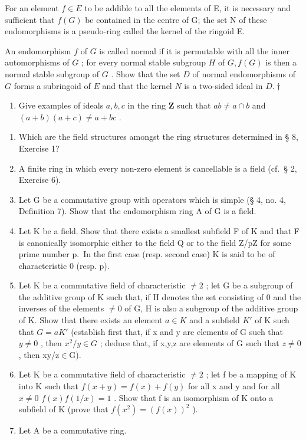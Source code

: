 For an element \(f \in E\) to be addible to all the elements of E, it is necessary and sufficient that \(f(G)\) be contained in the centre of G; the set N of these endomorphisms is a pseudo-ring called the kernel of the ringoid E.

An endomorphism \(f\) of \(G\) is called normal if it is permutable with all the inner automorphisms of \(G\) ; for every normal stable subgroup \(H\) of \(G, f(G)\) is then a normal stable subgroup of \(G\) . Show that the set \(D\) of normal endomorphisms of \(G\) forms a subringoid of \(E\) and that the kernel \(N\) is a two-sided ideal in \(D.†\)

\begin{enumerate}
\def\labelenumi{\arabic{enumi}.}
\setcounter{enumi}{15}
\tightlist
\item
  Give examples of ideals \(a, b, c\) in the ring \(\mathbf{Z}\) such that \(ab \neq a \cap b\) and \((a + b)(a + c) \neq a + bc\) .
\end{enumerate}

\BourbakiExercisesSection

\begin{enumerate}
\def\labelenumi{\arabic{enumi}.}
\item
  Which are the field structures amongst the ring structures determined in § 8, Exercise 1?
\item
  A finite ring in which every non-zero element is cancellable is a field (cf.~§ 2, Exercise 6).
\item
  Let G be a commutative group with operators which is simple (§ 4, no. 4, Definition 7). Show that the endomorphism ring A of G is a field.
\item
  Let K be a field. Show that there exists a smallest subfield F of K and that F is canonically isomorphic either to the field Q or to the field Z/pZ for some prime number p.~In the first case (resp. second case) K is said to be of characteristic 0 (resp. p).
\item
  Let K be a commutative field of characteristic \(\neq2\) ; let G be a subgroup of the additive group of K such that, if H denotes the set consisting of 0 and the inverses of the elements \(\neq0\) of G, H is also a subgroup of the additive group of K. Show that there exists an element \(a\in K\) and a subfield \(K'\) of K such that \(G=aK'\) (establish first that, if x and y are elements of G such that \(y\neq0\) , then \(x^{2}/y\in G\) ; deduce that, if x,y,z are elements of G such that \(z\neq0\) , then xy/z\ensuremath{\in}G).
\item
  Let K be a commutative field of characteristic \(\neq2\) ; let f be a mapping of K into K such that \(f(x+y)=f(x)+f(y)\) for all x and y and for all \(x\neq0\) \(f(x)f(1/x)=1\) . Show that f is an isomorphism of K onto a subfield of K (prove that \(f(x^{2})=(f(x))^{2}\) ).
\item
  Let A be a commutative ring.
\end{enumerate}

